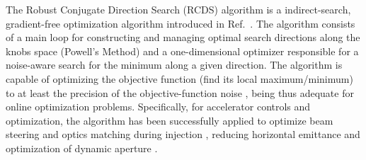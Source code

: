 The Robust Conjugate Direction Search (RCDS) algorithm is a indirect-search, gradient-free optimization algorithm introduced in Ref.~\cite{Huang:2013}. The algorithm consists of a main loop for constructing and managing optimal search directions along the knobs space (Powell's Method) and a one-dimensional optimizer responsible for a noise-aware search for the minimum along a given direction. The algorithm is capable of optimizing the objective function (find its local maximum/minimum) to at least the precision of the objective-function noise \cite{Huang:2013, huang2019beam}, being thus adequate for online optimization problems. Specifically, for accelerator controls and optimization, the algorithm has been successfully applied to optimize beam steering and optics matching during injection \cite{Huang:2013}, reducing horizontal emittance \cite{Huang:2013, Huang:2015}and optimization of dynamic aperture \cite{Huang:2013,Huang:2015,Liuzzo:IPAC2016-THPMR015,Olsson:IPAC2018-WEPAL047,yang:ipac2022-tupopt064}.
